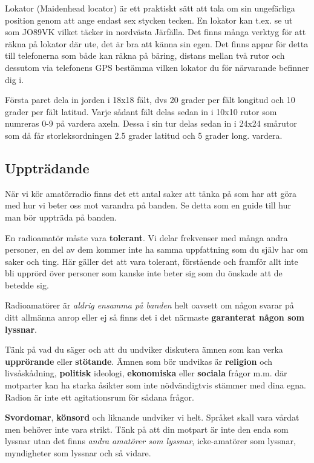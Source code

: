 Lokator (Maidenhead locator) är ett praktiskt sätt att tala om sin ungefärliga position genom att ange endast sex stycken tecken. En lokator kan t.ex. se ut som JO89VK vilket täcker in nordvästa Järfälla. Det finns många verktyg för att räkna på lokator där ute, det är bra att känna sin egen. Det finns appar för detta till telefonerna som både kan räkna på bäring, distans mellan två rutor och dessutom via telefonens GPS bestämma vilken lokator du för närvarande befinner dig i.

Första paret dela in jorden i 18x18 fält, dvs 20 grader per fält longitud och 10 grader per fält latitud. Varje sådant fält delas sedan in i 10x10 rutor som numreras 0-9 på vardera axeln. Dessa i sin tur delas sedan in i 24x24 smårutor som då får storleksordningen 2.5 grader latitud och 5 grader long. vardera.

\subsection{Uppträdande}

När vi kör amatörradio finns det ett antal saker att tänka på som har att göra med hur vi beter oss mot varandra på banden. Se detta som en guide till hur man bör uppträda på banden.

En radioamatör måste vara \textbf{tolerant}. Vi delar frekvenser med många andra personer, en del av dem kommer inte ha samma uppfattning som du själv har om saker och ting. Här gäller det att vara tolerant, förstående och framför allt inte bli upprörd över personer som kanske inte beter sig som du önskade att de betedde sig.

Radioamatörer är \emph{aldrig ensamma på banden} helt oavsett om någon svarar på ditt allmänna anrop eller ej så finns det i det närmaste \textbf{garanterat någon som lyssnar}. 

Tänk på vad du säger och att du undviker diskutera ämnen som kan verka \textbf{upprörande} eller \textbf{stötande}. Ämnen som bör undvikas är \textbf{religion} och livs\-å\-skå\-d\-ni\-ng, \textbf{politisk} ideologi, \textbf{ekonomiska} eller \textbf{sociala} frågor m.m. där motparter kan ha starka åsikter som inte nödvändigtvis stämmer med dina egna. Radion är inte ett agitationsrum för sådana frågor.

\textbf{Svordomar}, \textbf{könsord} och liknande undviker vi helt. Språket skall vara vårdat men behöver inte vara strikt. Tänk på att din motpart är inte den enda som lyssnar utan det finns \textit{andra amatörer som lyssnar}, icke-amatörer som lyssnar, myndigheter som lyssnar och så vidare.

